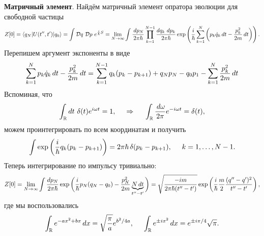
\textbf{Матричный элемент}.
Найдём матричный элемент опратора эволюции для свободной частицы
\begin{equation*}
    Z[0] = \bk{q_N}[U(t'',t')]{q_0} = \int \mathcal D q\ \mathcal D p\
    e^{\frac{i}{\hbar}S} = \lim_{N\to \infty}
    \int \frac{\d p_N}{2\pi\hbar} \prod_{k=1}^{N-1}
    \frac{d q_k\ d p_k}{2 \pi \hbar} \exp\left(
        \frac{i}{\hbar} \sum_{k=1}^{N} \left(
            p_k \dot{q}_k \d t - \frac{p_k^2}{2m}\d t
        \right)
    \right).
\end{equation*}
Перепишем аргумент экспоненты в виде
\begin{equation*}
    \sum_{k=1}^{N} p_k \dot{q}_k \, d t - \frac{p_k^2}{2m}\, d t =
    \sum_{k=1}^{N-1} q_k (p_k-p_{k+1}) + q_N p_N - q_0 p_1 - \sum_{k=1}^{N} \frac{p_k^2}{2m}\, d t
\end{equation*}
Вспоминая, что
\begin{equation*}
    \int_{\mathbb{R}} dt\ \delta(t) e^{i \omega t} = 1,
    \hspace{0.5cm} \Rightarrow \hspace{0.5cm}
    \int_{\mathbb{R}} \frac{\, d \omega}{2\pi}e^{-i \omega t} = \delta(t),
\end{equation*}
можем проинтегрировать по всем координатам и получить
\begin{equation*}
    \int \exp\left(\frac{i}{\hbar} q_k (p_k - p_{k+1})\right) = 2 \pi \hbar \, \delta(p_k - p_{k+1}),
    \hspace{5 mm} 
    k = 1,\ldots, N-1.
\end{equation*}
Теперь интегрирование по импульсу тривиально:
\begin{equation*}
    Z[0] = \lim_{N \to \infty} \int \frac{d p_N}{2 \pi \hbar} \exp\bigg(
        \frac{i}{\hbar} p_N (q_N-q_0) - \frac{p_N^2}{2m} \underbrace{ N \, d t}_{t''-t'}
    \bigg) = \sqrt{\frac{-i m}{2 \pi \hbar (t'' - t')}} \exp\left(
        \frac{i}{\hbar} \frac{m}{2} \frac{(q'' - q')^2}{t''-t'}
    \right),
\end{equation*}
где мы воспользовались 
\begin{equation*}
    \int_{\mathbb{R}} e^{-a x^2 + b x} \, d x = \sqrt{\frac{\pi}{a}} e^{b^2/4a},
    \hspace{5 mm} 
    \int_{\mathbb{R}} e^{\pm i x^2} \, d x = e^{\pm i \pi/4} \sqrt{\pi}.
\end{equation*}


